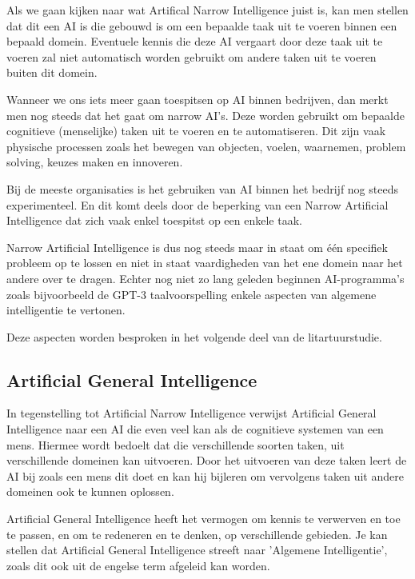 Als we gaan kijken naar wat Artifical Narrow Intelligence juist is, kan men stellen dat dit een AI is die gebouwd is om een bepaalde taak uit te voeren binnen een bepaald domein. Eventuele kennis die deze AI vergaart door deze taak uit te voeren zal niet automatisch worden gebruikt om andere taken uit te voeren buiten dit domein. 

Wanneer we ons iets meer gaan toespitsen op AI binnen bedrijven, dan merkt men nog steeds dat het gaat om narrow AI’s. Deze worden gebruikt om bepaalde cognitieve (menselijke) taken uit te voeren en te automatiseren. Dit zijn vaak physische processen zoals het bewegen van objecten, voelen, waarnemen, problem solving, keuzes maken en innoveren. 

Bij de meeste organisaties is het gebruiken van AI binnen het bedrijf nog steeds experimenteel. En dit komt deels door de beperking van een Narrow Artificial Intelligence dat zich vaak enkel toespitst op een enkele taak.

Narrow Artificial Intelligence is dus nog steeds maar in staat om één specifiek probleem op te lossen en niet in staat vaardigheden van het ene domein naar het andere over te dragen. Echter nog niet zo lang geleden beginnen AI-programma’s zoals bijvoorbeeld de GPT-3 taalvoorspelling enkele aspecten van algemene intelligentie te vertonen.

\autocite{benbya2020artificial}

Deze aspecten worden besproken in het volgende deel van de litartuurstudie.

\subsection{Artificial General Intelligence}

In tegenstelling tot Artificial Narrow Intelligence verwijst Artificial General Intelligence naar een AI die even veel kan als de cognitieve systemen van een mens. Hiermee wordt bedoelt dat die verschillende soorten taken, uit verschillende domeinen kan uitvoeren. Door het uitvoeren van deze taken leert de AI bij zoals een mens dit doet en kan hij bijleren om vervolgens taken uit andere domeinen ook te kunnen oplossen. 

Artificial General Intelligence heeft het vermogen om kennis te verwerven en toe te passen, en om te redeneren en te denken, op verschillende gebieden. Je kan stellen dat Artificial General Intelligence streeft naar 'Algemene Intelligentie', zoals dit ook uit de engelse term afgeleid kan worden. 

